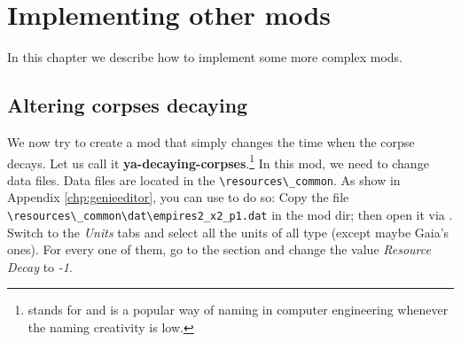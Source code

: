 \chapter{Implementing other mods}

In this chapter we describe how to implement some more complex mods.

\section{Altering corpses decaying}

We now try to create a mod that simply changes the time when the corpse decays. Let us call it \textbf{ya-decaying-corpses}.\footnote{ stands for  and is a popular way of naming in computer engineering whenever the naming creativity is low.} In this mod, we need to change data files. Data files are located in the \aoeexedir{}\verb|\resources\_common|. As show in Appendix \ref{chp:genieeditor}, you can use \genie{} to do so: Copy the file \aoeexedir{}\verb|\resources\_common\dat\empires2_x2_p1.dat| in the mod dir; then open it via \genie{}. Switch to the \textit{Units} tabs and select all the units of all type (except maybe Gaia's ones). For every one of them, go to the  section and change the value \textit{Resource Decay} to \textit{-1}.

